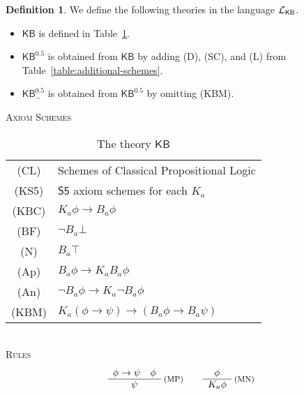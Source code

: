 \documentclass[12pt]{article}
\theoremstyle{definition}
\newtheorem{definition}[theorem]{Definition}
\newcommand{\Lang}{{\cal L}}   %
\newcommand{\KB}{{\mathsf{KB}}}                        %
\newcommand{\KBeq}{{\mathsf{KB}^{\mathsf{0.5}}}}       %
\newcommand{\KBeqm}{{\mathsf{KB}^{\mathsf{0.5}}_{-}}}  %
\begin{document}
\begin{definition}
  \label{definition:calculi}
  We define the following theories in the language $\Lang_\KB$.
  \begin{itemize}
  \item $\KB$ is defined in Table~\ref{table:KB}.

  \item $\KBeq$ is obtained from $\KB$ by adding (D), (SC), and (L)
    from Table~\ref{table:additional-schemes}.

  \item $\KBeqm$ is obtained from $\KBeq$ by omitting (KBM).
  \end{itemize}
\end{definition}

\begin{table}[ht]
  \begin{center}
    \textsc{Axiom Schemes}\\[.4em]
    \renewcommand{\arraystretch}{1.3}
    \begin{tabular}[t]{cl}
      (CL) &
      Schemes of Classical Propositional Logic
      \\
      (KS5) &
      $\mathsf{S5}$ axiom schemes for each $K_a$
      \\
      (KBC) &
      $K_a\phi\to B_a\phi$
      \\
      (BF) &
      $\lnot B_a\bot$
      \\
      (N) &
      $B_a\top$
      \\
      (Ap) &
      $B_a\phi\to K_aB_a\phi$
      \\
      (An) &
      $\lnot B_a\phi\to K_a\lnot B_a\phi$
      \\
      (KBM) &
      $K_a(\phi\to\psi)\to(B_a\phi\to B_a\psi)$
    \end{tabular}
    \renewcommand{\arraystretch}{1.0}
    \\[1em]
    \textsc{Rules}\vspace{-.5em}
    \[
    \begin{array}{c}
      \phi\to\psi \quad \phi
      \\\hline
      \psi
    \end{array}\;\text{\footnotesize(MP)}
    \qquad
    \begin{array}{c}
      \phi
      \\\hline
      K_a\phi
    \end{array}\;\text{\footnotesize(MN)}
    \]
  \end{center}
  \caption{The theory $\KB$}
  \label{table:KB}
\end{table}
\end{document}
